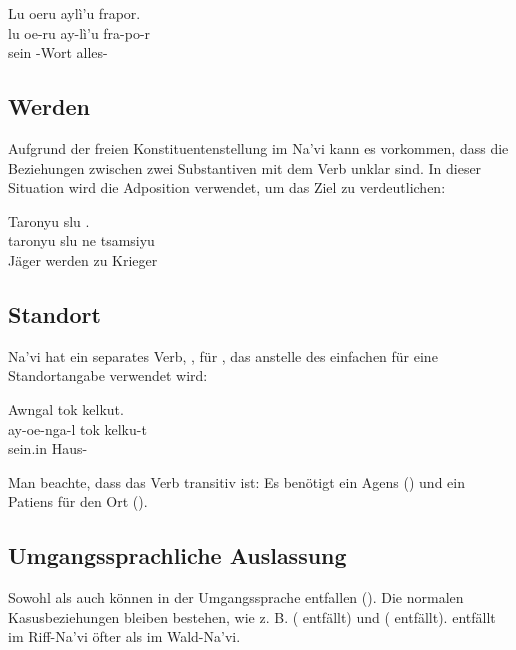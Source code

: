 \begin{interlin}
	\glll \Nfilm{}Lu oeru aylì'u frapor. \\
	lu oe-ru ay-lì'u fra-po-r \\
	sein  -Wort alles- \\
\end{interlin}

\subsection{Werden}
Aufgrund der freien Konstituentenstellung im Na'vi kann es vorkommen, dass die Beziehungen zwischen zwei Substantiven mit dem Verb   unklar sind. In dieser Situation wird die Adposition  verwendet, um das Ziel zu verdeutlichen:

\begin{interlin}
	\glll Taronyu slu  . \\
	taronyu slu ne tsamsiyu \\
	Jäger werden zu Krieger \\
\end{interlin}

\subsection{Standort} Na'vi hat ein separates Verb, , für , das anstelle des einfachen  für eine Standortangabe verwendet wird:

\begin{interlin}
  \glll \Npawl{}Awngal tok kelkut. \\
  ay-oe-nga-l tok kelku-t \\
   sein.in Haus- \\
\end{interlin}

\noindent Man beachte, dass das Verb  transitiv ist: Es benötigt ein Agens () und ein Patiens für den Ort ().

\subsection{Umgangssprachliche Auslassung}
Sowohl  als auch  können in der Umgangssprache entfallen (). Die normalen Kasusbeziehungen bleiben bestehen, wie z. B.   ( entfällt) und   ( entfällt).  entfällt im Riff-Na'vi öfter als im Wald-Na'vi.

